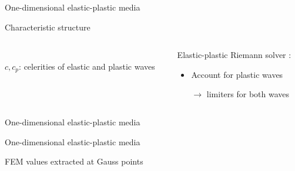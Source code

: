 \begin{frame}{One-dimensional elastic-plastic media}
\begin{block}{\footnotesize Characteristic structure \cite{Wang}}
\begin{columns}
\begin{column}{0.49\textwidth}
\begin{tikzpicture}[scale=0.6]
        \end{tikzpicture}\\
        \footnotesize $c,c_p$: celerities of elastic and plastic waves
      \end{column}
      \begin{column}{0.49\textwidth}
        \begin{block}{}
          \vspace{-0.95cm}
          \footnotesize Elastic-plastic Riemann solver \cite{Fogarty,Thomas_EP}:
          \begin{footnotesize}
            \begin{itemize}
            \item Account for \alert{plastic waves} 
            \item[$\rightarrow$] limiters for both waves
            \end{itemize}
          \end{footnotesize}
        \end{block}
      \end{column}
    \end{columns}
  \end{block}
  \vspace{-0.2cm}
\end{frame}

\begin{frame}{One-dimensional elastic-plastic media \cite{Thomas_EP}}
  \centering
\end{frame}


\begin{frame}{}
  \begin{block}{One-dimensional elastic-plastic media \cite{Thomas_EP}}
  \end{block}
  \begin{overprint}
    \centering
    
    FEM values extracted at Gauss points
    \centering
    
    
    \centering
    
      
  \end{overprint}
  \vspace{-0.1cm}
\end{frame}



